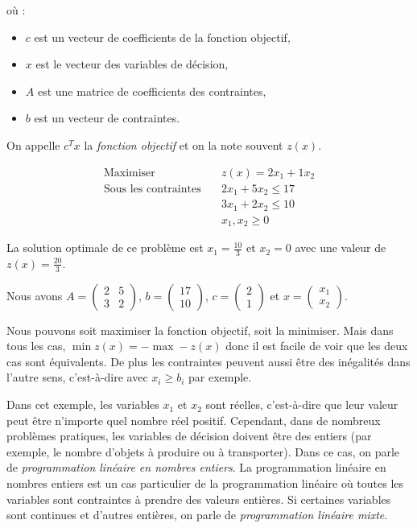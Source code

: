 \documentclass[a4paper]{article}
\begin{document}
où :
\begin{itemize}[label={\color{gray}\small \textbullet}]
	\item $c$ est un vecteur de coefficients de la fonction objectif,
	\item $x$ est le vecteur des variables de décision,
	\item $A$ est une matrice de coefficients des contraintes,
	\item $b$ est un vecteur de contraintes.
\end{itemize}
On appelle $c^T x$ la \emph{fonction objectif} et on la note souvent $z(x)$.
\begin{eg}
	\begin{align*}
	\text{Maximiser}\quad &z(x) = 2x_1 + 1x_2 \\
	\text{Sous les contraintes} \quad
	& 2x_1 + 5x_2 \leq 17 \\
	& 3x_1 + 2x_2 \leq 10 \\
	& x_1, x_2 \geq 0
	\end{align*}

La solution optimale de ce problème est $x_1 = \frac{10}{3}$ et $x_2 = 0$ avec une valeur de $z(x) = \frac{20}{3}$.

Nous avons $A = \begin{pmatrix}
	2 & 5 \\
	3 & 2
	\end{pmatrix}$, $b = \begin{pmatrix}
	17 \\
	10
	\end{pmatrix}$, $c = \begin{pmatrix}
	2 \\
	1
	\end{pmatrix}$ et $x = \begin{pmatrix}
	x_1 \\
	x_2
	\end{pmatrix}$.
\end{eg}
\begin{remark}
	Nous pouvons soit maximiser la fonction objectif, soit la minimiser. Mais dans tous les cas, $\min z(x) = -\max -z(x)$ donc il est facile de voir que les deux cas sont équivalents. De plus les contraintes peuvent aussi être des inégalités dans l'autre sens, c'est-à-dire avec $x_i \geq b_i$ par exemple.
\end{remark}
Dans cet exemple, les variables $x_1$ et $x_2$ sont réelles, c'est-à-dire que leur valeur peut être n'importe quel nombre réel positif. Cependant, dans de nombreux problèmes pratiques, les variables de décision doivent être des entiers (par exemple, le nombre d'objets à produire ou à transporter). Dans ce cas, on parle de \emph{programmation linéaire en nombres entiers}.
La programmation linéaire en nombres entiers est un cas particulier de la programmation linéaire où toutes les variables sont contraintes à prendre des valeurs entières. Si certaines variables sont continues et d'autres entières, on parle de \emph{programmation linéaire mixte}.
\end{document}
